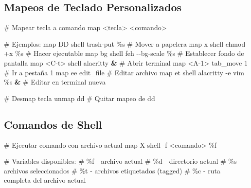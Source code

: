 \documentclass[
  doc,
  floatsintext,
  longtable,
  a4paper,
  nolmodern,
  notxfonts,
  notimes,
  12pt,
  colorlinks=true,linkcolor=blue,citecolor=blue,urlcolor=blue]{apa7}
\newenvironment{Shaded}{\begin{snugshade}}{\end{snugshade}}
\newcommand{\AttributeTok}[1]{\textcolor[rgb]{0.40,0.45,0.13}{#1}}
\newcommand{\CommentTok}[1]{\textcolor[rgb]{0.37,0.37,0.37}{#1}}
\newcommand{\ExtensionTok}[1]{\textcolor[rgb]{0.00,0.23,0.31}{#1}}
\newcommand{\KeywordTok}[1]{\textcolor[rgb]{0.00,0.23,0.31}{\textbf{#1}}}
\newcommand{\NormalTok}[1]{\textcolor[rgb]{0.00,0.23,0.31}{#1}}
\newcommand{\OperatorTok}[1]{\textcolor[rgb]{0.37,0.37,0.37}{#1}}
\begin{document}
\subsection{Mapeos de Teclado
Personalizados}\label{mapeos-de-teclado-personalizados}

\begin{Shaded}
\begin{Highlighting}[]
\CommentTok{\# Mapear tecla a comando}
\ExtensionTok{map} \OperatorTok{\textless{}}\NormalTok{tecla}\OperatorTok{\textgreater{}} \OperatorTok{\textless{}}\NormalTok{comando}\OperatorTok{\textgreater{}}

\CommentTok{\# Ejemplos:}
\ExtensionTok{map}\NormalTok{ DD shell trash{-}put \%s          }\CommentTok{\# Mover a papelera}
\ExtensionTok{map}\NormalTok{ x shell chmod +x \%s            }\CommentTok{\# Hacer ejecutable}
\ExtensionTok{map}\NormalTok{ bg shell feh }\AttributeTok{{-}{-}bg{-}scale}\NormalTok{ \%s     }\CommentTok{\# Establecer fondo de pantalla}
\ExtensionTok{map} \OperatorTok{\textless{}}\NormalTok{C{-}t}\OperatorTok{\textgreater{}}\NormalTok{ shell alacritty }\KeywordTok{\&}        \CommentTok{\# Abrir terminal}
\ExtensionTok{map} \OperatorTok{\textless{}}\NormalTok{A{-}1}\OperatorTok{\textgreater{}}\NormalTok{ tab\_move 1               }\CommentTok{\# Ir a pestaña 1}
\ExtensionTok{map}\NormalTok{ ee edit\_file                   }\CommentTok{\# Editar archivo}
\ExtensionTok{map}\NormalTok{ et shell alacritty }\AttributeTok{{-}e}\NormalTok{ vim \%s }\KeywordTok{\&} \CommentTok{\# Editar en terminal nueva}

\CommentTok{\# Desmap tecla}
\ExtensionTok{unmap}\NormalTok{ dd  }\CommentTok{\# Quitar mapeo de dd}
\end{Highlighting}
\end{Shaded}

\subsection{Comandos de Shell}\label{comandos-de-shell-1}

\begin{Shaded}
\begin{Highlighting}[]
\CommentTok{\# Ejecutar comando con archivo actual}
\ExtensionTok{map}\NormalTok{ X shell }\AttributeTok{{-}f} \OperatorTok{\textless{}}\NormalTok{comando}\OperatorTok{\textgreater{}}\NormalTok{ \%f}

\CommentTok{\# Variables disponibles:}
\CommentTok{\# \%f {-} archivo actual}
\CommentTok{\# \%d {-} directorio actual}
\CommentTok{\# \%s {-} archivos seleccionados}
\CommentTok{\# \%t {-} archivos etiquetados (tagged)}
\CommentTok{\# \%c {-} ruta completa del archivo actual}
\end{Highlighting}
\end{Shaded}
\end{document}
